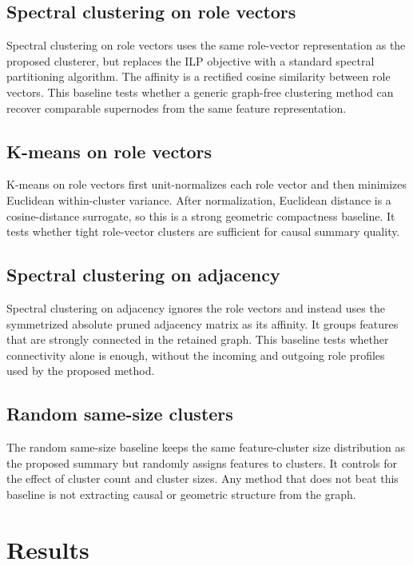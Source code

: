 \documentclass[../main.tex]{subfiles}
\begin{document}
\subsection{Spectral clustering on role vectors}
Spectral clustering on role vectors uses the same role-vector representation as
the proposed clusterer, but replaces the ILP objective with a standard spectral
partitioning algorithm. The affinity is a rectified cosine similarity between
role vectors. This baseline tests whether a generic graph-free clustering method
can recover comparable supernodes from the same feature representation.

\subsection{K-means on role vectors}
K-means on role vectors first unit-normalizes each role vector and then minimizes
Euclidean within-cluster variance. After normalization, Euclidean distance is a
cosine-distance surrogate, so this is a strong geometric compactness baseline.
It tests whether tight role-vector clusters are sufficient for causal summary
quality.

\subsection{Spectral clustering on adjacency}
Spectral clustering on adjacency ignores the role vectors and instead uses the
symmetrized absolute pruned adjacency matrix as its affinity. It groups features
that are strongly connected in the retained graph. This baseline tests whether
connectivity alone is enough, without the incoming and outgoing role profiles
used by the proposed method.

\subsection{Random same-size clusters}
The random same-size baseline keeps the same feature-cluster size distribution
as the proposed summary but randomly assigns features to clusters. It controls
for the effect of cluster count and cluster sizes. Any method that does not beat
this baseline is not extracting causal or geometric structure from the graph.

\section{Results}
\label{sec:results}
\end{document}
